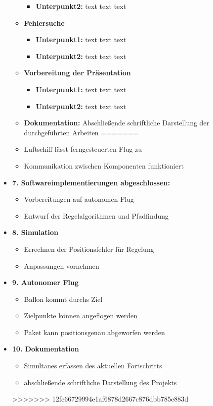 \documentclass[lang=ngerman,inputenc=utf8,fontsize=10pt]{ldvarticle}
\begin{document}
\begin{itemize}
\begin{itemize}
\begin{itemize}
			\item \textbf{Unterpunkt2:} text text text
		\end{itemize}
	\item \textbf{Fehlersuche}  
		\begin{itemize}
			\item \textbf{Unterpunkt1:} text text text
			\item \textbf{Unterpunkt2:} text text text
		\end{itemize}
	\item \textbf{Vorbereitung der Präsentation}  
		\begin{itemize}
			\item \textbf{Unterpunkt1:} text text text
			\item \textbf{Unterpunkt2:} text text text
		\end{itemize}
	\item \textbf{Dokumentation:} Abschließende schriftliche Darstellung der durchgeführten Arbeiten
=======
\item Luftschiff lässt ferngesteuerten Flug zu
\item Kommunikation zwischen Komponenten funktioniert
\end{itemize}
\item \textbf{7. Softwareimplementierungen abgeschlossen:}
\begin{itemize}
\item Vorbereitungen auf autonomen Flug 
\item Entwurf der Regelalgorithmen und Pfadfindung
\end{itemize}
\item \textbf{8. Simulation}
\begin{itemize}
\item Errechnen der Positionsfehler für Regelung
\item Anpassungen vornehmen
\end{itemize}
\item \textbf{9. Autonomer Flug}
\begin{itemize}
\item Ballon kommt durchs Ziel
\item Zielpunkte können angeflogen werden
\item Paket kann positionsgenau abgeworfen werden
\end{itemize}
\item \textbf{10. Dokumentation}
\begin{itemize}
\item Simultanes erfassen des aktuellen Fortschritts
\item abschließende schriftliche Darstellung des Projekts
\end{itemize}


>>>>>>> 12fc66729994e1af6878d2667c876dbb785e883d
\end{itemize}
\end{document}

